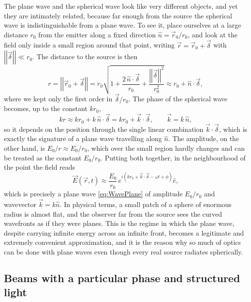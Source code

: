        The plane wave and the spherical wave look like very different objects, and yet they are intimately related, because far enough from the source the spherical wave is indistinguishable from a plane wave. To see it, place ourselves at a large distance $r_0$ from the emitter along a fixed direction $\hat{n} = \vec{r}_0/r_0$, and look at the field only inside a small region around that point, writing $\vec{r} = \vec{r}_0 + \vec{\delta}$ with $\left|\left|\vec{\delta}\right|\right| \ll r_0$. The distance to the source is then
       \begin{equation*}
            r = \left|\left|\vec{r}_0 + \vec{\delta}\right|\right| = r_0\sqrt{1 + \frac{2\,\hat{n}\cdot\vec{\delta}}{r_0} + \frac{\left|\left|\vec{\delta}\right|\right|^2}{r_0^2}} \approx r_0 + \hat{n}\cdot\vec{\delta},
       \end{equation*}
       where we kept only the first order in $\vec{\delta}/r_0$. The phase of the spherical wave becomes, up to the constant $kr_0$,
       \begin{equation*}
            kr \approx kr_0 + k\,\hat{n}\cdot\vec{\delta} = kr_0 + \vec{k}\cdot\vec{\delta}, \qquad \vec{k} = k\,\hat{n},
       \end{equation*}
       so it depends on the position through the single linear combination $\vec{k}\cdot\vec{\delta}$, which is exactly the signature of a plane wave travelling along $\hat{n}$. The amplitude, on the other hand, is $E_0/r \approx E_0/r_0$, which over the small region hardly changes and can be treated as the constant $E_0/r_0$. Putting both together, in the neighbourhood of the point the field reads
       \begin{equation*}
            \vec{E}(\vec{r},t) \approx \frac{E_0}{r_0}\, e^{i\left(kr_0 + \vec{k}\cdot\vec{\delta} - \omega t + \phi\right)}\hat{e},
       \end{equation*}
       which is precisely a plane wave \ref{eq:WavePlane} of amplitude $E_0/r_0$ and wavevector $\vec{k} = k\hat{n}$. In physical terms, a small patch of a sphere of enormous radius is almost flat, and the observer far from the source sees the curved wavefronts as if they were planes. This is the regime in which the plane wave, despite carrying infinite energy across an infinite front, becomes a legitimate and extremely convenient approximation, and it is the reason why so much of optics can be done with plane waves even though every real source radiates spherically.

    \subsection{Beams with a particular phase and structured light}


